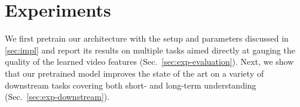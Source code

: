 \documentclass[10pt,twocolumn,letterpaper]{article}
\newcommand{\ccCR}[1]{{\color{black}{}#1}}
\begin{document}
\section{Experiments}
\label{sec:exp}




We first pretrain our architecture \ccCR{with the setup and parameters discussed in \cref{sec:impl}} and report its results on multiple tasks aimed directly at gauging the quality of the learned video features (Sec.~\ref{sec:exp-evaluation}).  
Next, we show that our pretrained model improves the state of the art on a variety of downstream tasks covering both short- and long-term understanding (Sec.~\ref{sec:exp-downstream}). 






{
 \setlength{\tabcolsep}{1pt}
 \setlength{\extrarowheight}{1.5pt}
\begin{table*}[t]\footnotesize
\begin{center}
\begin{tabular}{ L{3.2cm}||C{1.0cm}|C{1.0cm}|C{1.0cm}|C{2.2cm}||C{1.9cm}|C{1.9cm}||C{1.9cm}|C{1.9cm}  }


\end{tabular}
\end{center}
\end{table*}}
\end{document}

